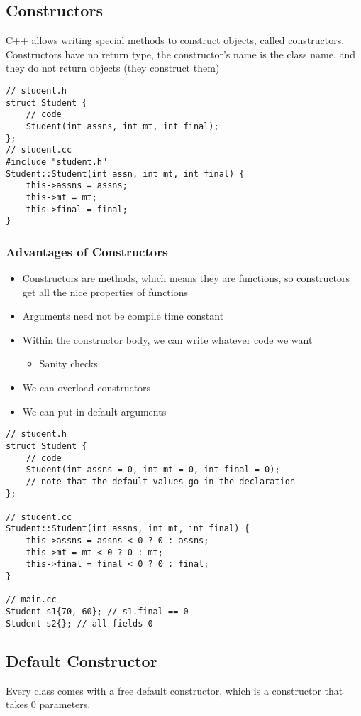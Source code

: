 \documentclass[12pt]{article}
\begin{document}
\subsection{Constructors}
C++ allows writing special methods to construct objects, called constructors. Constructors have no return type, the constructor's name is the class name, and they do not return objects (they construct them)
\begin{lstlisting}
// student.h
struct Student {
    // code
    Student(int assns, int mt, int final);
};
// student.cc
#include "student.h"
Student::Student(int assn, int mt, int final) {
    this->assns = assns;
    this->mt = mt;
    this->final = final;
}
\end{lstlisting}

\subsubsection{Advantages of Constructors}
\begin{itemize}
    \item Constructors are methods, which means they are functions, so constructors get all the nice properties of functions
    \item Arguments need not be compile time constant
    \item Within the constructor body, we can write whatever code we want
    \begin{itemize}
        \item Sanity checks
    \end{itemize}
    \item We can overload constructors
    \item We can put in default arguments
\end{itemize}
\begin{lstlisting}
// student.h
struct Student {
    // code
    Student(int assns = 0, int mt = 0, int final = 0);
    // note that the default values go in the declaration
};

// student.cc
Student::Student(int assns, int mt, int final) {
    this->assns = assns < 0 ? 0 : assns;
    this->mt = mt < 0 ? 0 : mt;
    this->final = final < 0 ? 0 : final;
}

// main.cc
Student s1{70, 60}; // s1.final == 0
Student s2{}; // all fields 0
\end{lstlisting}

\subsection{Default Constructor}
Every class comes with a free default constructor, which is a constructor that takes 0 parameters. 
\end{document}
